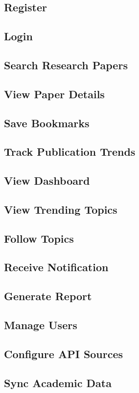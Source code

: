 \subsection{Register}

\subsection{Login}

\subsection{Search Research Papers}

\subsection{View Paper Details}

\subsection{Save Bookmarks}

\subsection{Track Publication Trends}

\subsection{View Dashboard}

\subsection{View Trending Topics}

\subsection{Follow Topics}

\subsection{Receive Notification}

\subsection{Generate Report}

\subsection{Manage Users}

\subsection{Configure API Sources}

\subsection{Sync Academic Data}